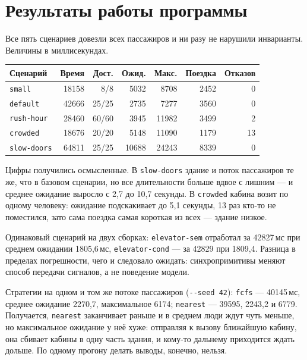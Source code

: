 \documentclass[12pt,a4paper]{article}
\begin{document}
\section{Результаты работы программы}

Все пять сценариев довезли всех пассажиров и ни разу не нарушили
инварианты. Величины в миллисекундах.

\begin{center}
\begin{tabular}{@{}lrrrrrr@{}}
\textbf{Сценарий} & \textbf{Время} & \textbf{Дост.} & \textbf{Ожид.} &
\textbf{Макс.} & \textbf{Поездка} & \textbf{Отказов} \\
\hline
\verb|small| & 18158 & 8/8 & 5032 & 8708 & 2452 & 0 \\
\verb|default| & 42666 & 25/25 & 2735 & 7277 & 3560 & 0 \\
\verb|rush-hour| & 28460 & 60/60 & 3945 & 11982 & 3499 & 2 \\
\verb|crowded| & 18676 & 20/20 & 5148 & 11090 & 1179 & 13 \\
\verb|slow-doors| & 64811 & 25/25 & 10688 & 24243 & 8339 & 0 \\
\hline
\end{tabular}
\end{center}

Цифры получились осмысленные. В \verb|slow-doors| здание и поток
пассажиров те же, что в базовом сценарии, но все длительности больше вдвое
с лишним --- и среднее ожидание выросло с 2,7 до 10,7 секунды. В
\verb|crowded| кабина возит по одному человеку: ожидание подскакивает до
5,1 секунды, 13 раз кто-то не поместился, зато сама поездка самая
короткая из всех --- здание низкое.

Одинаковый сценарий на двух сборках: \verb|elevator-sem| отработал за
42827\,мс при среднем ожидании 1805,6\,мс, \verb|elevator-cond| --- за
42829 при 1809,4. Разница в пределах погрешности, чего и следовало
ожидать: синхропримитивы меняют способ передачи сигналов, а не поведение
модели.

Стратегии на одном и том же потоке пассажиров (\verb|--seed 42|):
\verb|fcfs| --- 40145\,мс, среднее ожидание 2270,7, максимальное 6174;
\verb|nearest| --- 39595, 2243,2 и 6779. Получается, \verb|nearest|
заканчивает раньше и в среднем люди ждут чуть меньше, но максимальное
ожидание у неё хуже: отправляя к вызову ближайшую кабину, она сбивает
кабины в одну часть здания, и кому-то дальнему приходится ждать дольше.
По одному прогону делать выводы, конечно, нельзя.
\end{document}
